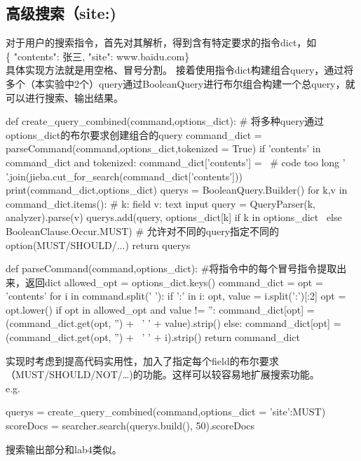 \documentclass[12pt,a4paper]{article}
\begin{document}
\subsection{高级搜索（site:)}
对于用户的搜索指令，首先对其解析，得到含有特定要求的指令dict，如\\ \{ "contents": 张三, "site": www.baidu.com\} \\
具体实现方法就是用空格、冒号分割。
接着使用指令dict构建组合query，通过将多个（本实验中2个）query通过BooleanQuery进行布尔组合构建一个总query，就可以进行搜索、输出结果。
\begin{python}
def create_query_combined(command,options_dict):  
#  将多种query通过options_dict的布尔要求创建组合的query
    command_dict = parseCommand(command,options_dict,tokenized = True)
    if 'contents' in command_dict and tokenized:
        command_dict['contents'] = \  # code too long
        	' '.join(jieba.cut_for_search(command_dict['contents']))
    print(command_dict,options_dict)
    querys = BooleanQuery.Builder()
    for k,v in command_dict.items():    # k: field  v: text input
        query = QueryParser(k, analyzer).parse(v)
        querys.add(query, options_dict[k] if k in options_dict \
        	else BooleanClause.Occur.MUST)  
        # 允许对不同的query指定不同的option(MUST/SHOULD/...)
    return querys
    
def parseCommand(command,options_dict): 
#将指令中的每个冒号指令提取出来，返回dict
    allowed_opt = options_dict.keys()
    command_dict = {}
    opt = 'contents'
    for i in command.split(' '):
        if ':' in i:
            opt, value = i.split(':')[:2]
            opt = opt.lower()
            if opt in allowed_opt and value != '':
                command_dict[opt] = (command_dict.get(opt, '') + \ 
                	' ' + value).strip()
        else:
            command_dict[opt] = (command_dict.get(opt, '') + \ 
            	' ' + i).strip()
    return command_dict
\end{python}
实现时考虑到提高代码实用性，加入了指定每个field的布尔要求（MUST/SHOULD/NOT/\dots)的功能。这样可以较容易地扩展搜索功能。\\
e.g.
\begin{python}
querys = create_query_combined(command,options_dict = {'site':MUST})
scoreDocs = searcher.search(querys.build(), 50).scoreDocs
\end{python}
搜索输出部分和lab4类似。
\end{document}
